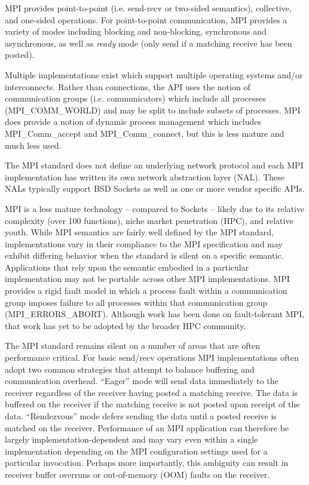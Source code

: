 MPI provides point-to-point (i.e. send-recv or two-sided semantics), collective, and
one-sided operations. For point-to-point communication, MPI provides a variety of modes
including blocking and non-blocking, synchronous and asynchronous, as well as \emph{ready}
mode (only send if a matching receive has been posted).

Multiple implementations exist\cite{ompi_04_pvmmpi_overview, Gropp:1996:HPI, Liu:2003:RDMA, intel-mpi, platform-mpi}
which support multiple operating systems and/or interconnects.  Rather than connections,
the API uses the notion of communication groups (i.e.  communicators) which include all
processes (MPI\_COMM\_WORLD) and may be split to include subsets of processes. MPI does
provide a notion of dynamic process management which includes MPI\_Comm\_accept and
MPI\_Comm\_connect, but this is less mature and much less used.

The MPI standard does not define an underlying network protocol and each MPI
implementation has written its own network abstraction layer (NAL). These NALs typically
support BSD Sockets as well as one or more vendor specific APIs.

MPI is a less mature technology -- compared to Sockets -- likely due to its
relative complexity (over 100 functions), niche market penetration
(HPC), and relative youth. While MPI semantics are fairly well defined
by the MPI standard, implementations vary in their compliance to the
MPI specification and may exhibit differing behavior when the standard is
silent on a specific semantic. Applications that rely upon the
semantic embodied in a particular implementation may not be portable
across other MPI implementations. MPI provides a rigid fault model in
which a process fault within a communication group imposes failure to
all processes within that communication group
(MPI\_ERRORS\_ABORT). Although work has been done on fault-tolerant
MPI\cite{fagg04:_fault_toler_commun_librar_applic_high_perof, mpi-ft},
that work has yet to be adopted by the broader HPC community. 

The MPI standard remains silent on a number of areas that are often
performance critical. For basic send/recv operations MPI
implementations often adopt two common strategies that attempt to
balance buffering and communication overhead. ``Eager'' mode will send
data immediately to the receiver regardless of the receiver having
posted a matching receive. The data is buffered on the receiver if the
matching receive is not posted upon receipt of the
data. ``Rendezvous'' mode defers sending the data until a posted
receive is matched on the receiver. Performance of an MPI application
can therefore be largely implementation-dependent and may vary even
within a single implementation depending on the MPI configuration
settings used for a particular invocation. Perhaps more importantly,
this ambiguity can result in receiver buffer overruns or out-of-memory
(OOM) faults on the receiver.

